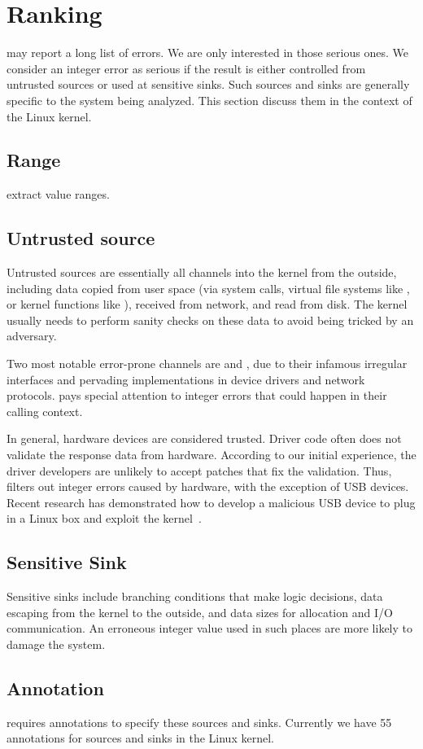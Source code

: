 \section{Ranking}
\label{s:rank}

\sys may report a long list of errors.  We are only interested in
those serious ones.  We consider an integer error as serious if the
result is either controlled from untrusted sources or used at
sensitive sinks.  Such sources and sinks are generally specific to
the system being analyzed.  This section discuss them in the context
of the Linux kernel.

\subsection{Range}

extract value ranges.

\subsection{Untrusted source}

Untrusted sources are essentially all channels into the kernel from
the outside, including data copied from user space (via system
calls, virtual file systems like , or kernel functions
like ), received from network, and read from
disk.
The kernel usually needs to perform sanity checks on these data to
avoid being tricked by an adversary.

Two most notable error-prone channels are  and ,
due to their infamous irregular interfaces and pervading implementations
in device drivers and network protocols.  \sys pays special attention
to integer errors that could happen in their calling context.

In general, hardware devices are considered trusted.  Driver code
often does not validate the response data from hardware.  According
to our initial experience, the driver developers are unlikely to
accept patches that fix the validation.  Thus, \sys filters out
integer errors caused by hardware,
%
with the exception of USB devices.  Recent research has demonstrated
how to develop a malicious USB device to plug in a Linux box and
exploit the kernel~\cite{usb:buffer-overflow}.

\subsection{Sensitive Sink}

Sensitive sinks include branching conditions that make logic
decisions, data escaping from the kernel to the outside, and data
sizes for allocation and I/O communication.  An erroneous integer
value used in such places are more likely to damage the system.

\subsection{Annotation}

\sys requires annotations to specify these sources and sinks.
Currently we have 55 annotations for sources and sinks in the Linux kernel.

